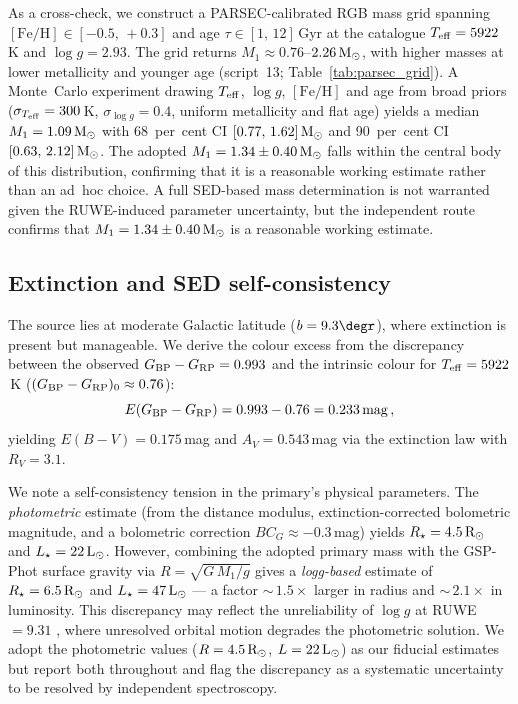\documentclass[usenatbib,fleqn]{mnras}
\newcommand{\Msun}{{\rm M}_\odot}
\newcommand{\Lsun}{{\rm L}_\odot}
\newcommand{\Rsun}{{\rm R}_\odot}
\begin{document}
As a cross-check, we construct a PARSEC-calibrated RGB mass grid
\citep{Bressan2012} spanning
$[\mathrm{Fe/H}] \in [-0.5,\,+0.3]$ and age
$\tau \in [1,\,12]\,$Gyr at the catalogue
$T_{\rm eff} = 5922\,$K and $\log g = 2.93$.  The grid returns
$M_1 \approx 0.76$--$2.26\,\Msun$, with higher masses at lower
metallicity and younger age
(script~13; Table~\ref{tab:parsec_grid}).  A Monte~Carlo
experiment drawing $T_{\rm eff}$, $\log g$, $[\mathrm{Fe/H}]$
and age from broad priors ($\sigma_{T_{\rm eff}} = 300\,$K,
$\sigma_{\log g} = 0.4$, uniform metallicity and flat age)
yields a median $M_1 = 1.09\,\Msun$ with 68~per~cent CI
$[0.77,\,1.62]\,\Msun$ and 90~per~cent CI
$[0.63,\,2.12]\,\Msun$.  The adopted
$M_1 = 1.34 \pm 0.40\,\Msun$ falls within the central
body of this distribution, confirming that it is a reasonable
working estimate rather than an ad~hoc choice.
A full SED-based mass determination is not warranted given
the RUWE-induced parameter uncertainty, but the independent route
confirms that $M_1 = 1.34 \pm 0.40\,\Msun$ is a reasonable
working estimate.

\subsection{Extinction and SED self-consistency}
\label{sec:methods:extinction}

The source lies at moderate Galactic latitude ($b = 9.3\degr$),
where extinction is present but manageable.  We derive the colour
excess from the discrepancy between the observed
$G_{\rm BP} - G_{\rm RP} = 0.993$ and the intrinsic colour for
$T_{\rm eff} = 5922$\,K
($(G_{\rm BP} - G_{\rm RP})_0 \approx 0.76$):
\begin{equation}
E(G_{\rm BP} - G_{\rm RP}) = 0.993 - 0.76 = 0.233\,{\rm mag}\,,
\end{equation}
yielding $E(B-V) = 0.175$\,mag and
$A_V = 0.543$\,mag via the \citet{Cardelli1989} extinction law
with $R_V = 3.1$.

We note a self-consistency tension in the primary's physical
parameters.  The \emph{photometric} estimate (from the
distance modulus, extinction-corrected bolometric magnitude, and
a bolometric correction $BC_G \approx -0.3$\,mag) yields
$R_\star = 4.5\,\Rsun$ and $L_\star = 22\,\Lsun$.  However,
combining the adopted primary mass with the GSP-Phot surface gravity
via $R = \sqrt{G\,M_1 / g}$ gives a \emph{logg-based}
estimate of $R_\star = 6.5\,\Rsun$ and
$L_\star = 47\,\Lsun$ --- a factor $\sim$\,$1.5\times$ larger in
radius and $\sim$\,$2.1\times$ in luminosity.  This discrepancy
may reflect the unreliability of $\log g$ at
RUWE~$= 9.31$ \citep{Andrae2023}, where unresolved orbital motion
degrades the photometric solution.  We adopt the photometric
values ($R = 4.5\,\Rsun$, $L = 22\,\Lsun$) as our fiducial
estimates but report both throughout and flag the discrepancy
as a systematic uncertainty to be resolved by independent
spectroscopy.
\end{document}

